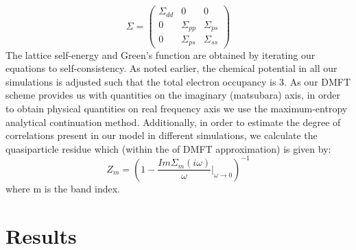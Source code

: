 \documentclass[10pt]{ruthesis}
\begin{document}
{\begin{equation}\label{selfenergy}
\Sigma=
\left(
\begin{array}{ccc}
\Sigma_{dd}&0&0\\
0&\Sigma_{pp}&\Sigma_{ps}\\
0&\Sigma_{ps}&\Sigma_{ss}
\end{array}
\right)
\end{equation}
The lattice self-energy and Green's function are obtained by iterating our equations to self-consistency. As noted earlier, the chemical potential in all our simulations is adjusted such that the total electron occupancy is  $3$. As our DMFT scheme provides us with quantities on the imaginary (matsubara) axis, in order
to obtain physical quantities on real frequency axis we use the maximum-entropy analytical continuation method\cite{PhysicsReports_MEM_1996_M.Jarrell}. Additionally, in order to estimate the degree of correlations present in our model in different simulations, we calculate the quasiparticle residue which (within the of DMFT approximation) is given by:
\begin{equation}\label{QP}
 Z_m=(1-\frac{Im\Sigma_m(i\omega)}{\omega}|_{\omega\rightarrow 0})^{-1}
\end{equation} 
where m is the band index.

\section{Results}
}
\end{document}

